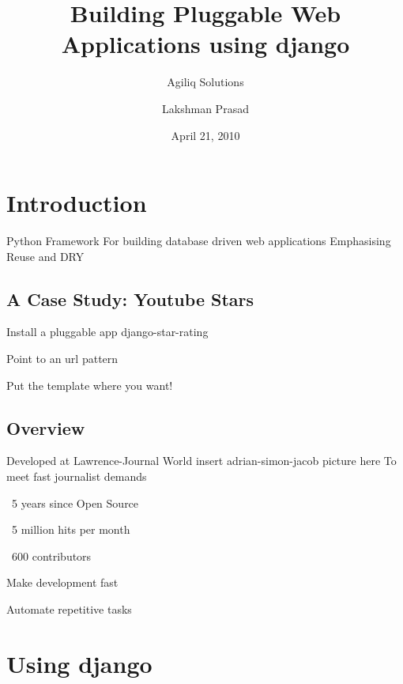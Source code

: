 \documentclass{beamer}
\title{Building Pluggable Web Applications using django}
\author{Lakshman Prasad}
\institute{Great Indian Developer Summit}
\subtitle{Agiliq Solutions}
\date{April 21, 2010}
\begin{document}
\begin{frame}
  \titlepage
  \inserttitlegraphic
\end{frame}

\section{Introduction}
	\begin{frame}
	{Python Framework}
	For building database driven web applications
	Emphasising Reuse and DRY
	\end{frame}
	\subsection{A Case Study: Youtube Stars}
		\begin{frame}
			{Install a pluggable app \alert{django-star-rating} }
		\end{frame}
		\begin{frame}
			{Point to an url pattern}
		\end{frame}
		\begin{frame}
			{Put the template where you want!}
		\end{frame}
	\begin{frame}
	  \tableofcontents
	 \end{frame}
	\subsection{Overview}
		\begin{frame}
			{Developed at Lawrence-Journal World}
			insert adrian-simon-jacob picture here
			To meet fast journalist demands
		\end{frame}
		\begin{frame}
			{~5 years since Open Source}
		\end{frame}
		\begin{frame}
			{~5 million hits per month}
		\end{frame}
		\begin{frame}
			{~600 contributors}
		\end{frame}
		\begin{frame}
			{Make development fast}
		\end{frame}
		\begin{frame}
			{Automate repetitive tasks}
		\end{frame}
	
\section{Using django}
\end{document}
